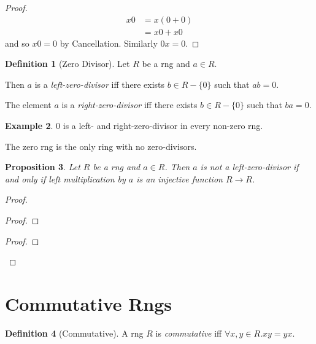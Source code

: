 \documentclass{book}
\let\qed\relax
\newtheorem{prop}{Proposition}[chapter]
\theoremstyle{definition}
\newtheorem{df}[prop]{Definition}
\newtheorem{ex}[prop]{Example}
\begin{document}
\begin{proof}
\pf
\begin{align*}
x0 & = x(0+0) \\
& = x0+x0
\end{align*}
and so $x0 = 0$ by Cancellation. Similarly $0x = 0$. \qed
\end{proof}

\begin{df}[Zero Divisor]
Let $R$ be a rng and $a \in R$.

Then $a$ is a \emph{left-zero-divisor} iff there exists $b \in R - \{0\}$ such that $ab = 0$.

The element $a$ is a \emph{right-zero-divisor} iff there exists $b \in R - \{0\}$ such that $ba = 0$.
\end{df}

\begin{ex}
0 is a left- and right-zero-divisor in every non-zero rng.

The zero rng is the only ring with no zero-divisors.
\end{ex}

\begin{prop}
Let $R$ be a rng and $a \in R$. Then $a$ is not a left-zero-divisor if and only if left multiplication by $a$ is an injective function $R \rightarrow R$.
\end{prop}

\begin{proof}
\pf
{}
\begin{proof}
\end{proof}
\begin{proof}
\end{proof}
\qed
\end{proof}

\section{Commutative Rngs}

\begin{df}[Commutative]
A rng $R$ is \emph{commutative} iff $\forall x,y \in R. xy = yx$.
\end{df}
\end{document}
